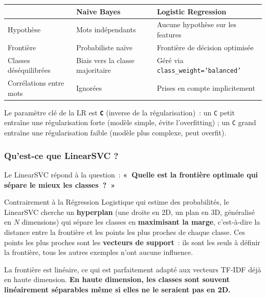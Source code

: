 \documentclass[12pt,a4paper]{article}
\begin{document}
\begin{center}
\renewcommand{\arraystretch}{1.2}
\begin{tabular}{lll}
\toprule
 & \textbf{Naive Bayes} & \textbf{Logistic Regression} \\
\midrule
Hypothèse               & Mots indépendants            & Aucune hypothèse sur les features \\
Frontière               & Probabiliste naïve           & Frontière de décision optimisée \\
Classes déséquilibrées  & Biais vers la classe majoritaire & Géré via \texttt{class\_weight='balanced'} \\
Corrélations entre mots & Ignorées                     & Prises en compte implicitement \\
\bottomrule
\end{tabular}
\end{center}

Le paramètre clé de la LR est \textbf{\texttt{C}} (inverse de la régularisation)~: un \texttt{C} petit entraîne une régularisation forte (modèle simple, évite l'overfitting) ; un \texttt{C} grand entraîne une régularisation faible (modèle plus complexe, peut overfit).

\subsubsection*{Qu'est-ce que LinearSVC ?}

Le LinearSVC répond à la question~: \textbf{«~Quelle est la frontière optimale qui sépare le mieux les classes~?~»}

Contrairement à la Régression Logistique qui estime des probabilités, le LinearSVC cherche un \textbf{hyperplan} (une droite en 2D, un plan en 3D, généralisé en $N$ dimensions) qui sépare les classes en \textbf{maximisant la marge}, c'est-à-dire la distance entre la frontière et les points les plus proches de chaque classe. Ces points les plus proches sont les \textbf{vecteurs de support}~: ils sont les seuls à définir la frontière, tous les autres exemples n'ont aucune influence.

La frontière est linéaire, ce qui est parfaitement adapté aux vecteurs TF-IDF déjà en haute dimension. \textbf{En haute dimension, les classes sont souvent linéairement séparables même si elles ne le seraient pas en 2D.}
\end{document}
